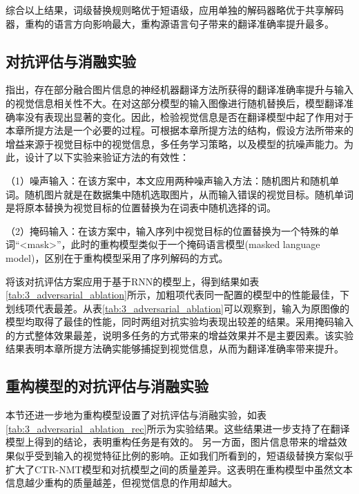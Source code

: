 综合以上结果，词级替换规则略优于短语级，应用单独的解码器略优于共享解码器，重构的语言方向影响最大，重构源语言句子带来的翻译准确率提升最多。

\subsection{对抗评估与消融实验}
\label{sec:3_adversarial_ablation}

指出，存在部分融合图片信息的神经机器翻译方法所获得的翻译准确率提升与输入的视觉信息相关性不大。在对这部分模型的输入图像进行随机替换后，模型翻译准确率没有表现出显著的变化。因此，检验视觉信息是否在翻译模型中起了作用对于本章所提方法是一个必要的过程。可根据本章所提方法的结构，假设方法所带来的增益来源于视觉目标中的视觉信息，多任务学习策略，以及模型的抗噪声能力。为此，设计了以下实验来验证方法的有效性：

（1）{\sffamily 噪声输入：}在该方案中，本文应用两种噪声输入方法：随机图片和随机单词。随机图片就是在数据集中随机选取图片，从而输入错误的视觉目标。随机单词是将原本替换为视觉目标的位置替换为在词表中随机选择的词。

（2）{\sffamily 掩码输入：}在该方案中，输入序列中视觉目标的位置替换为一个特殊的单词“<mask>”，此时的重构模型类似于一个掩码语言模型(masked language model)，区别在于重构模型采用了序列解码的方式。


将该对抗评估方案应用于基于RNN的模型上，得到结果如表\ref{tab:3_adversarial_ablation}所示，加粗项代表同一配置的模型中的性能最佳，下划线项代表最差。从表\ref{tab:3_adversarial_ablation}可以观察到，输入为原图像的模型均取得了最佳的性能，同时两组对抗实验均表现出较差的结果。采用掩码输入的方式整体效果最差，说明多任务的方式带来的增益效果并不是主要因素。该实验结果表明本章所提方法确实能够捕捉到视觉信息，从而为翻译准确率带来提升。

\subsection{重构模型的对抗评估与消融实验}
\label{sec:3_adversarial_ablation_rec}


本节还进一步地为重构模型设置了对抗评估与消融实验，如表\ref{tab:3_adversarial_ablation_rec}所示为实验结果。这些结果进一步支持了在翻译模型上得到的结论，表明重构任务是有效的。 另一方面，图片信息带来的增益效果似乎受到输入的视觉特征比例的影响。正如我们所看到的，短语级替换方案似乎扩大了CTR-NMT模型和对抗模型之间的质量差异。这表明在重构模型中虽然文本信息越少重构的质量越差，但视觉信息的作用却越大。

